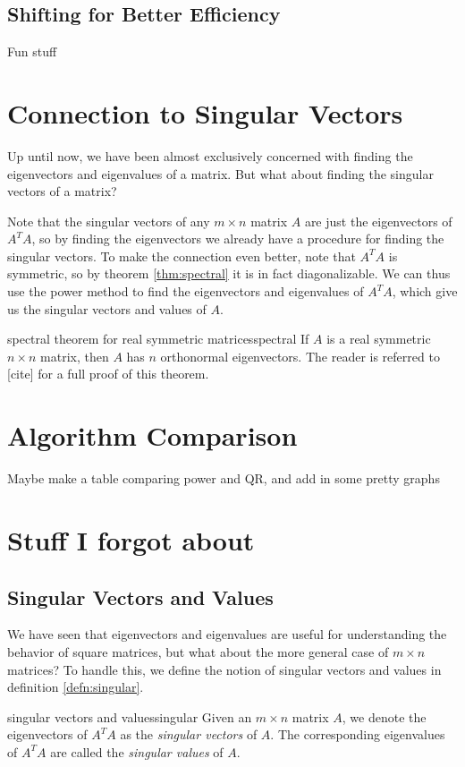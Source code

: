 \documentclass{article}
\begin{document}
\subsection{Shifting for Better Efficiency}
Fun stuff

\section{Connection to Singular Vectors}
Up until now, we have been almost exclusively concerned with finding the eigenvectors and eigenvalues of a matrix. But what about finding the singular vectors of a matrix?

Note that the singular vectors of any $m \times n$ matrix $A$ are just the eigenvectors of $A^TA$, so by finding the eigenvectors we already have a procedure for finding the singular vectors. To make the connection even better, note that $A^TA$ is symmetric, so by theorem \ref{thm:spectral} it is in fact diagonalizable. We can thus use the power method to find the eigenvectors and eigenvalues of $A^TA$, which give us the singular vectors and values of $A$.

\begin{theorem}{spectral theorem for real symmetric matrices}{spectral}
  If $A$ is a real symmetric $n \times n$ matrix, then $A$ has $n$ orthonormal eigenvectors. The reader is referred to [cite] for a full proof of this theorem.
\end{theorem}

\section{Algorithm Comparison}
Maybe make a table comparing power and QR, and add in some pretty graphs

\section{Stuff I forgot about}

\subsection{Singular Vectors and Values}
We have seen that eigenvectors and eigenvalues are useful for understanding the behavior of square matrices, but what about the more general case of $m \times n$ matrices? To handle this, we define the notion of singular vectors and values in definition \ref{defn:singular}.

\begin{definition}{singular vectors and values}{singular}
  Given an $m \times n$ matrix $A$, we denote the eigenvectors of $A^TA$ as the \textit{singular vectors} of $A$. The corresponding eigenvalues of $A^TA$ are called the \textit{singular values} of $A$.
\end{definition}
\end{document}
